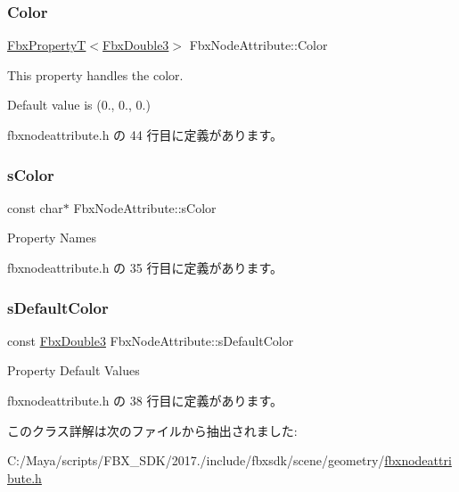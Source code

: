 \subsubsection{\texorpdfstring{Color}{Color}}
{\footnotesize\ttfamily \hyperlink{class_fbx_property_t}{Fbx\+PropertyT}$<$\hyperlink{fbxtypes_8h_ae0a96f14cde566774c7553aa7523b7a7}{Fbx\+Double3}$>$ Fbx\+Node\+Attribute\+::\+Color}

This property handles the color.

Default value is (0., 0., 0.) 

 fbxnodeattribute.\+h の 44 行目に定義があります。

\mbox{\label{class_fbx_node_attribute_a0155b227cd9d72c796155bdda2c4c9e5}} 
\subsubsection{\texorpdfstring{s\+Color}{sColor}}
{\footnotesize\ttfamily const char$\ast$ Fbx\+Node\+Attribute\+::s\+Color\hspace{0.3cm}{\ttfamily [static]}}



Property Names 



 fbxnodeattribute.\+h の 35 行目に定義があります。

\mbox{\label{class_fbx_node_attribute_a06cca505ad9c2964060cbcb3bbf6795b}} 
\subsubsection{\texorpdfstring{s\+Default\+Color}{sDefaultColor}}
{\footnotesize\ttfamily const \hyperlink{fbxtypes_8h_ae0a96f14cde566774c7553aa7523b7a7}{Fbx\+Double3} Fbx\+Node\+Attribute\+::s\+Default\+Color\hspace{0.3cm}{\ttfamily [static]}}



Property Default Values 



 fbxnodeattribute.\+h の 38 行目に定義があります。



このクラス詳解は次のファイルから抽出されました\+:\begin{DoxyCompactItemize}
\item 
C\+:/\+Maya/scripts/\+F\+B\+X\+\_\+\+S\+D\+K/2017./include/fbxsdk/scene/geometry/\hyperlink{fbxnodeattribute_8h}{fbxnodeattribute.\+h}\end{DoxyCompactItemize}
